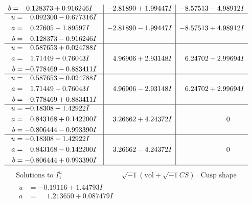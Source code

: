\documentclass[1p]{elsarticle_modified}
\theoremstyle{definition}
\newcommand{\I}{\sqrt{-1}}
\begin{document}
$$\begin{array}{c|c|c}
\begin{aligned}
b &= \phantom{-}0.128373 + 0.916246 I\end{aligned}
 & -2.81890 + 1.99447 I & -8.57513 - 4.98912 I \\ \hline\begin{aligned}
u &= \phantom{-}0.092300 - 0.677316 I \\
a &= \phantom{-}0.27605 - 1.89597 I \\
b &= \phantom{-}0.128373 - 0.916246 I\end{aligned}
 & -2.81890 - 1.99447 I & -8.57513 + 4.98912 I \\ \hline\begin{aligned}
u &= \phantom{-}0.587653 + 0.024788 I \\
a &= \phantom{-}1.71449 + 0.76043 I \\
b &= -0.778469 - 0.883411 I\end{aligned}
 & \phantom{-}4.96906 + 2.93148 I & \phantom{-}6.24702 - 2.99694 I \\ \hline\begin{aligned}
u &= \phantom{-}0.587653 - 0.024788 I \\
a &= \phantom{-}1.71449 - 0.76043 I \\
b &= -0.778469 + 0.883411 I\end{aligned}
 & \phantom{-}4.96906 - 2.93148 I & \phantom{-}6.24702 + 2.99694 I \\ \hline\begin{aligned}
u &= -0.18308 + 1.42922 I \\
a &= \phantom{-}0.843168 + 0.142200 I \\
b &= -0.806444 - 0.993390 I\end{aligned}
 & \phantom{-}3.26662 + 4.24372 I & \phantom{-0.000000 } 0 \\ \hline\begin{aligned}
u &= -0.18308 - 1.42922 I \\
a &= \phantom{-}0.843168 - 0.142200 I \\
b &= -0.806444 + 0.993390 I\end{aligned}
 & \phantom{-}3.26662 - 4.24372 I & \phantom{-0.000000 } 0\\
 \hline 
 \end{array}$$\newpage$$\begin{array}{c|c|c}  
\text{Solutions to }I^u_{1}& \I (\text{vol} + \sqrt{-1}CS) & \text{Cusp shape}\\
 \hline 
\begin{aligned}
u &= -0.19116 + 1.44793 I \\
a &= \phantom{-}1.213650 + 0.087479 I \\

\end{aligned}
\end{array}$$
\end{document}
